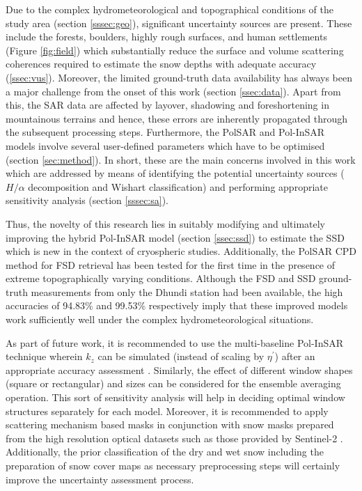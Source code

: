 \documentclass[review]{elsarticle}
\numberwithin{equation}{section}
\numberwithin{figure}{section}
\numberwithin{table}{section}
\begin{document}
Due to the complex hydrometeorological and topographical conditions of the study area (section \ref{sssec:geo}), significant uncertainty sources are present. These include the forests, boulders, highly rough surfaces, and human settlements (Figure \ref{fig:field}) which substantially reduce the surface and volume scattering coherences required to estimate the snow depths with adequate accuracy (\ref{ssec:vus}). Moreover, the limited ground-truth data availability has always been a major challenge from the onset of this work (section \ref{ssec:data}). Apart from this, the SAR data are affected by layover, shadowing and foreshortening in mountainous terrains and hence, these errors are inherently propagated through the subsequent processing steps. Furthermore, the PolSAR and Pol-InSAR models involve several user-defined parameters which have to be optimised (section \ref{sec:method}). In short, these are the main concerns involved in this work which are addressed by means of identifying the potential uncertainty sources ($H/{\alpha}$ decomposition and Wishart classification) and performing appropriate sensitivity analysis (section \ref{sssec:sa}).

Thus, the novelty of this research lies in suitably modifying and ultimately improving the hybrid Pol-InSAR model (section \ref{ssec:ssd}) to estimate the SSD which is new in the context of cryospheric studies. Additionally, the PolSAR CPD method for FSD retrieval has been tested for the first time in the presence of extreme topographically varying conditions. Although the FSD and SSD ground-truth measurements from only the Dhundi station had been available, the high accuracies of 94.83\% and 99.53\% respectively imply that these improved models work sufficiently well under the complex hydrometeorological situations.

As part of future work, it is recommended to use the multi-baseline Pol-InSAR technique \citep{Cloude2010} wherein $k_z$ can be simulated (instead of scaling by $\eta^\prime$) after an appropriate accuracy assessment \citep{Kumar2017}. Similarly, the effect of different window shapes (square or rectangular) and sizes can be considered for the ensemble averaging operation. This sort of sensitivity analysis will help in deciding optimal window structures separately for each model. Moreover, it is recommended to apply scattering mechanism based masks in conjunction with snow masks prepared from the high resolution optical datasets such as those provided by Sentinel-2 \citep{Zhu2015}. Additionally, the prior classification of the dry and wet snow including the preparation of snow cover maps \citep{Leinss2018, Thakur2012, Zhu2015} as necessary preprocessing steps will certainly improve the uncertainty assessment process.
\end{document}
